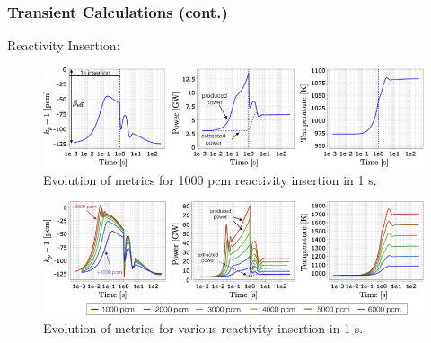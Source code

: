\begin{frame}
        \frametitle{Transient Calculations (cont.)}
                Reactivity Insertion:
                \begin{figure}[htbp!]
                        \begin{center}
                        \includegraphics[scale=0.5]{JC-Oct16/ria.jpg}
                        \end{center}
                        \caption{Evolution of metrics for 1000 pcm reactivity insertion in 1 s.}
                        \label{fig:ria}
                \end{figure}
                \begin{figure}[htbp!]
                        \begin{center}
                        \includegraphics[scale=0.5]{JC-Oct16/ria-variations.jpg}
                        \end{center}
                        \caption{Evolution of metrics for various reactivity insertion in 1 s.}
                        \label{fig:ria-variations}
                \end{figure}
        
        
\end{frame}